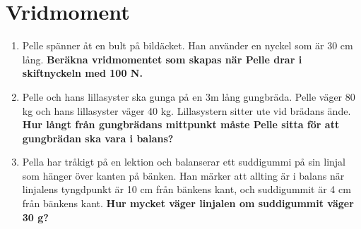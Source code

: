 \documentclass[11pt]{article}
\begin{document}
\raggedright
\setcounter{section}{2}
\section{Vridmoment}

\begin{enumerate}[itemsep=2em]
        \item
              \begin{minipage}[t]{0.5\textwidth}
                      Pelle spänner åt en bult på bildäcket. Han använder en nyckel som är 30 cm lång. \textbf{Beräkna vridmomentet som skapas när Pelle drar i skiftnyckeln med 100 N.}
              \end{minipage}
              \hfill
              \begin{adjustbox}{valign=t}
                      
              \end{adjustbox}
        \item
              Pelle och hans lillasyster ska gunga på en 3m lång gungbräda. Pelle väger 80 kg och hans lillasyster väger 40 kg. Lillasystern sitter ute vid brädans ände. \textbf{Hur långt från gungbrädans mittpunkt måste Pelle sitta för att gungbrädan ska vara i balans?}
              \begin{center}
                      
              \end{center}

        \item
              Pella har tråkigt på en lektion och balanserar ett suddigummi på sin linjal som hänger över kanten på bänken. Han märker att allting är i balans när linjalens tyngdpunkt är 10 cm från bänkens kant, och suddigummit är 4 cm från bänkens kant. \textbf{Hur mycket väger linjalen om suddigummit väger 30 g?}
              \begin{center}
                
              \end{center}

\end{enumerate}

\newpage
\end{document}

